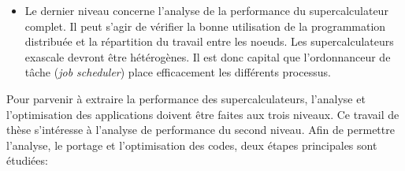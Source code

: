 \begin{itemize}
            \item Le dernier niveau concerne l'analyse de la performance du supercalculateur complet. Il peut s'agir de vérifier la bonne utilisation de la programmation distribuée et la répartition du travail entre les noeuds. Les supercalculateurs \gls{exascale} devront être hétérogènes. Il est donc capital que l'ordonnanceur de tâche (\textit{job scheduler}) place efficacement les différents processus.
        
        \end{itemize}
        
        Pour parvenir à extraire la performance des supercalculateurs, l'analyse et l'optimisation des applications doivent être faites aux trois niveaux. Ce travail de thèse s'intéresse à l'analyse de performance du second niveau. Afin de permettre l'analyse, le portage et l'optimisation des codes, deux étapes principales sont étudiées:
